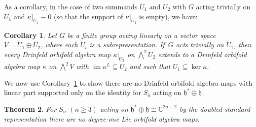 \documentclass[pdftex]{sigma}
\numberwithin{equation}{section}
\newtheorem{Theorem}{Theorem}[section]
\newtheorem{Corollary}[Theorem]{Corollary}
\DeclareMathOperator{\im}{im}
\begin{document}
 As a corollary, in the case of two summands $U_1$ and $U_2$ with $G$ acting trivially on $U_1$ and $\kappa|_{U_1}\equiv 0$ (so that the support of $\kappa|_{U_1}$ is empty), we have:

\begin{Corollary}\label{prop:Extension}
	Let $G$ be a finite group acting linearly on a vector space $V=U_1\oplus U_2$, where each $U_i$ is a subrepresentation. If~$G$ acts trivially on $U_1$, then every Drinfeld orbifold algebra map $\kappa|_{U_2}$ on $\bigwedge^2 U_2$ extends to a Drinfeld orbifold algebra map $\kappa$ on $\bigwedge^2 V$ with $\im\kappa^L\subseteq U_2$ and such that $U_1\subseteq \ker\kappa$.
\end{Corollary}

We now use Corollary~\ref{prop:Extension} to show there are no Drinfeld orbifold algebra maps with linear part
supported only on the identity for $S_n$ acting on $\mathfrak{h}^* \oplus \mathfrak{h}$.

\begin{Theorem}\label{thm:LOAMapsDoubledStd}
For $S_n$ $(n \geq 3)$ acting on $\mathfrak{h}^*\oplus\mathfrak{h} \cong\mathbb{C}^{2n-2}$ by the doubled
standard representation there are no degree-one Lie orbifold algebra maps.
\end{Theorem}
\end{document}
